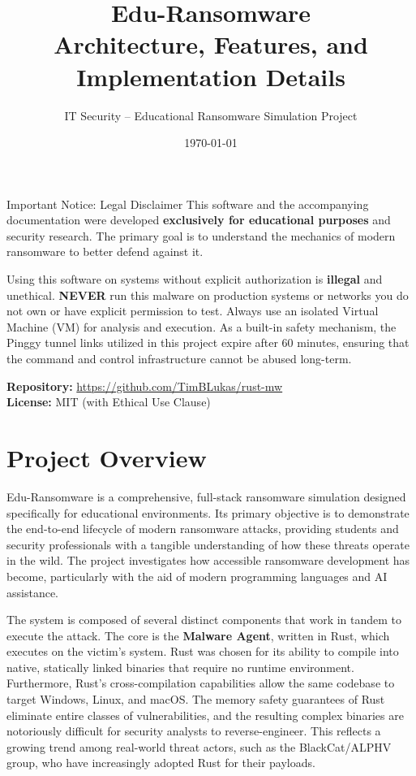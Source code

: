 \documentclass[12pt,a4paper]{article}
\title{\textbf{Edu-Ransomware}\\ \Large Architecture, Features, and Implementation Details}
\author{IT Security -- Educational Ransomware Simulation Project}
\date{\today}
\begin{document}
\maketitle

\begin{dangerbox}{Important Notice: Legal Disclaimer}
This software and the accompanying documentation were developed \textbf{exclusively for educational purposes} and security research. The primary goal is to understand the mechanics of modern ransomware to better defend against it.

Using this software on systems without explicit authorization is \textbf{illegal} and unethical. \textbf{NEVER} run this malware on production systems or networks you do not own or have explicit permission to test. Always use an isolated Virtual Machine (VM) for analysis and execution. As a built-in safety mechanism, the Pinggy tunnel links utilized in this project expire after 60 minutes, ensuring that the command and control infrastructure cannot be abused long-term.

\textbf{Repository:} \url{https://github.com/TimBLukas/rust-mw}\\
\textbf{License:} MIT (with Ethical Use Clause)
\end{dangerbox}

\tableofcontents
\newpage

\section{Project Overview}

Edu-Ransomware is a comprehensive, full-stack ransomware simulation designed specifically for educational environments. Its primary objective is to demonstrate the end-to-end lifecycle of modern ransomware attacks, providing students and security professionals with a tangible understanding of how these threats operate in the wild. The project investigates how accessible ransomware development has become, particularly with the aid of modern programming languages and AI assistance.

The system is composed of several distinct components that work in tandem to execute the attack. The core is the \textbf{Malware Agent}, written in Rust, which executes on the victim's system. Rust was chosen for its ability to compile into native, statically linked binaries that require no runtime environment. Furthermore, Rust's cross-compilation capabilities allow the same codebase to target Windows, Linux, and macOS. The memory safety guarantees of Rust eliminate entire classes of vulnerabilities, and the resulting complex binaries are notoriously difficult for security analysts to reverse-engineer. This reflects a growing trend among real-world threat actors, such as the BlackCat/ALPHV group, who have increasingly adopted Rust for their payloads.
\end{document}
